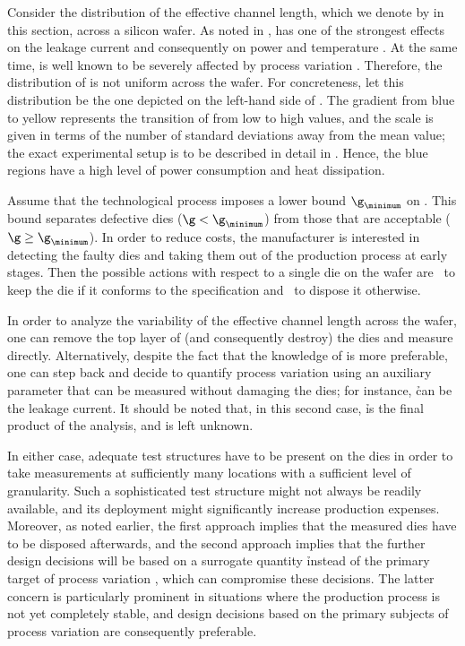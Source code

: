 Consider the distribution of the effective channel length, which we denote by \g
in this section, across a silicon wafer. As noted in , \g has
one of the strongest effects on the leakage current and consequently on power
and temperature \cite{juan2012}. At the same time, \g is well known to be
severely affected by process variation \cite{chandrakasan2000, srivastava2010}.
Therefore, the distribution of \g is not uniform across the wafer. For
concreteness, let this distribution be the one depicted on the left-hand side of
. The gradient from blue to yellow
represents the transition of \g from low to high values, and the scale is given
in terms of the number of standard deviations away from the mean value; the
exact experimental setup is to be described in detail in .
Hence, the blue regions have a high level of power consumption and heat
dissipation.

Assume that the technological process imposes a lower bound $\g_\minimum$ on \g.
This bound separates defective dies ($\g < \g_\minimum$) from those that are
acceptable ($\g \geq \g_\minimum$). In order to reduce costs, the manufacturer
is interested in detecting the faulty dies and taking them out of the production
process at early stages. Then the possible actions with respect to a single die
on the wafer are \one~to keep the die if it conforms to the specification and
\two~to dispose it otherwise.

In order to analyze the variability of the effective channel length \g across
the wafer, one can remove the top layer of (and consequently destroy) the dies
and measure \g directly. Alternatively, despite the fact that the knowledge of
\g is more preferable, one can step back and decide to quantify process
variation using an auxiliary parameter \h that can be measured without damaging
the dies; for instance, \h can be the leakage current. It should be noted that,
in this second case, \h is the final product of the analysis, and \g is left
unknown.

In either case, adequate test structures have to be present on the dies in order
to take measurements at sufficiently many locations with a sufficient level of
granularity. Such a sophisticated test structure might not always be readily
available, and its deployment might significantly increase production expenses.
Moreover, as noted earlier, the first approach implies that the measured dies
have to be disposed afterwards, and the second approach implies that the further
design decisions will be based on a surrogate quantity \h instead of the primary
target of process variation \g, which can compromise these decisions. The latter
concern is particularly prominent in situations where the production process is
not yet completely stable, and design decisions based on the primary subjects of
process variation are consequently preferable.

